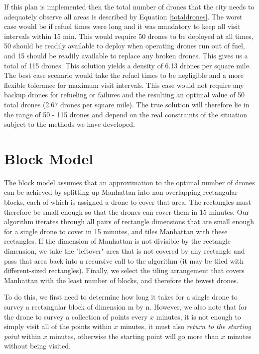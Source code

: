 \documentclass{article}
\begin{document}
If this plan is implemented then the total number of drones that the city needs to adequately observe all areas is described by Equation \ref{totaldrones}. The worst case would be if refuel times were long and it was mandatory to keep all visit intervals within 15 min. This would require 50 drones to be deployed at all times, 50 should be readily available to deploy when operating drones run out of fuel, and 15 should be readily available to replace any broken drones. This gives us a total of 115 drones. This solution yields a density of 6.13 drones per square mile. The best case scenario would take the refuel times to be negligible and a more flexible tolerance for maximum visit intervals. This case would not require any backup drones for refueling or failures and the resulting an optimal value of 50 total drones (2.67 drones per square mile). The true solution will therefore lie in the range of 50 - 115 drones and depend on the real constraints of the situation subject to the methods we have developed.

\section{Block Model}
\label{sec:block_model}
The block model assumes that an approximation to the optimal number of drones can be achieved by splitting up Manhattan into non-overlapping rectangular blocks, each of which is assigned a drone to cover that area. The rectangles must therefore be small enough so that the drones can cover them in 15 minutes. Our algorithm iterates through all pairs of rectangle dimensions that are small enough for a single drone to cover in 15 minutes, and tiles Manhattan with these rectangles. If the dimension of Manhattan is not divisible by the rectangle dimension, we take the "leftover" area that is not covered by any rectangle and pass that area back into a recursive call to the algorithm (it may be tiled with different-sized rectangles). Finally, we select the tiling arrangement that covers Manhattan with the least number of blocks, and therefore the fewest drones.

To do this, we first need to determine how long it takes for a single drone to survey a rectangular block of dimension m by n. However, we also note that for the drone to survey a collection of points every $x$ minutes, it is not enough to simply visit all of the points within $x$ minutes, it must also \textit{return to the starting point} within $x$ minutes, otherwise the starting point will go more than $x$ minutes without being visited.
\end{document}
